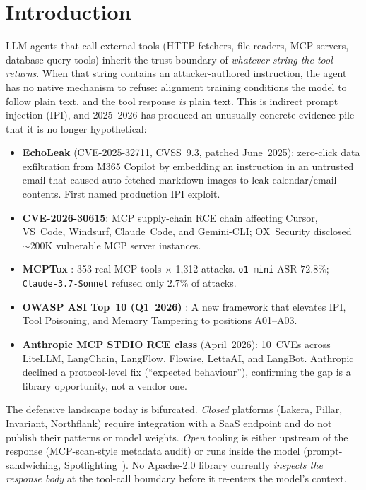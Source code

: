 \section{Introduction}
\label{sec:intro}

LLM agents that call external tools (HTTP fetchers, file readers,
MCP servers, database query tools) inherit the trust boundary of
\emph{whatever string the tool returns}. When that string contains
an attacker-authored instruction, the agent has no native mechanism
to refuse: alignment training conditions the model to follow plain
text, and the tool response \emph{is} plain text. This is indirect
prompt injection (IPI), and 2025--2026 has produced an unusually
concrete evidence pile that it is no longer hypothetical:

\begin{itemize}[leftmargin=*,nosep]
\item \textbf{EchoLeak} (CVE-2025-32711, CVSS~9.3,
patched June~2025): zero-click data exfiltration from M365 Copilot
by embedding an instruction in an untrusted email that caused
auto-fetched markdown images to leak calendar/email contents.
First named production IPI exploit.
\item \textbf{CVE-2026-30615}: MCP supply-chain RCE chain
affecting Cursor, VS~Code, Windsurf, Claude~Code, and Gemini-CLI;
OX~Security disclosed $\sim$200K vulnerable MCP server instances.
\item \textbf{MCPTox} \cite{mcptox2025}: 353 real MCP tools $\times$
1{,}312 attacks. \texttt{o1-mini} ASR $72.8\%$;
\texttt{Claude-3.7-Sonnet} refused only $2.7\%$ of attacks.
\item \textbf{OWASP ASI Top~10 (Q1~2026)} \cite{owaspasi2026}:
A new framework that elevates IPI, Tool Poisoning, and Memory
Tampering to positions A01--A03.
\item \textbf{Anthropic MCP STDIO RCE class} (April~2026): 10~CVEs
across LiteLLM, LangChain, LangFlow, Flowise, LettaAI, and
LangBot. Anthropic declined a protocol-level fix
(``expected behaviour''), confirming the gap is a library
opportunity, not a vendor one.
\end{itemize}

The defensive landscape today is bifurcated. \emph{Closed} platforms
(Lakera, Pillar, Invariant, Northflank) require integration with a
SaaS endpoint and do not publish their patterns or model weights.
\emph{Open} tooling is either upstream of the response
(MCP-scan-style metadata audit) or runs inside the model
(prompt-sandwiching, Spotlighting~\cite{hines2024spotlight}). No
Apache-2.0 library currently \emph{inspects the response body} at
the tool-call boundary before it re-enters the model's context.

